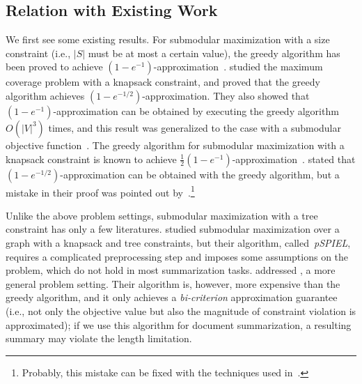 \documentclass[11pt,a4paper]{article}
\begin{document}
	\subsection{Relation with Existing Work}
	We first see some existing results. 
	For submodular maximization with a size constraint 
	(i.e., $|S|$ must be at most a certain value), 
	the greedy algorithm has been proved to achieve $(1-e^{-1})$-approximation~\cite{nemhauser1978analysis}. 
	\citet{khuller1999budgeted} studied the maximum coverage 
	problem with a knapsack constraint, 
	and proved that the greedy algorithm 
	achieves $(1-e^{-1/2})$-approximation. 
	They also showed that $(1-e^{-1})$-approximation 
	can be obtained by executing the greedy algorithm 
	$O(|V|^3)$ times, 
	and this result was generalized to the case with 
	a submodular objective function~\cite{sviridenko2004note}. 
	The greedy algorithm
	for submodular maximization with a knapsack constraint 
	is known to achieve  
	$\frac{1}{2}(1-e^{-1})$-approximation~\cite{leskovec2007cost}. 
	\citet{lin2010multi} stated that $(1-e^{-1/2})$-approximation 
	can be obtained with the greedy algorithm, 
	but 
	a mistake in their proof was pointed out 
	by~\citet{morita2013subtree}.\footnote{Probably, this mistake can be fixed with the techniques used in~\cite{khuller1999budgeted}.} 
	
	Unlike the above problem settings, 
	submodular maximization with a tree constraint 
	has only a few literatures. 
	\citet{krause2006near} studied submodular maximization over a graph with a knapsack and tree constraints, but their algorithm, 
	called~{\it pSPIEL}, 
	requires a complicated preprocessing step 
	and imposes some assumptions on the problem, 
	which do not hold in most summarization tasks. 
	\citet{iyer2013submodular} addressed \scskp, 
	a more general problem setting. 
	Their algorithm is, however, 
	more expensive than the greedy algorithm, 
	and 
	it only achieves a {\it bi-criterion} approximation guarantee 
	(i.e., not only the objective value but also  
	the magnitude of constraint violation is approximated); 
	if we use this algorithm for document summarization, 
	a resulting summary may violate the length limitation.  
	
\end{document}
